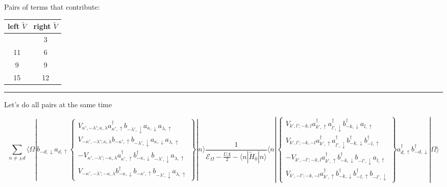 \documentclass[
  letterpaper,
  DIV=11,
  numbers=noendperiod]{scrartcl}
\newcounter{none} %
\begin{document}
Pairs of terms that contribute:

{\def\LTcaptype{none} %
\begin{longtable}[]{@{}cc@{}}
\toprule\noalign{}
left \(\tilde V\) & right \(\tilde V\) \\
\midrule\noalign{}
\endhead
\bottomrule\noalign{}
\endlastfoot
4 & 3 \\
11 & 6 \\
9 & 9 \\
15 & 12 \\
\end{longtable}
}

\begin{center}\rule{0.5\linewidth}{0.5pt}\end{center}

Let's do all pairs at the same time

\begin{equation}
\sum_{n\ne \pm d}\langle\Omega|b_{-d,\downarrow}a_{d,\uparrow}
\left\{
\begin{matrix}
V_{\kappa',-\lambda';\kappa,\lambda}a^\dagger_{\kappa',\uparrow}b^{}_{-\lambda',\downarrow}a^{}_{\kappa,\downarrow}a^{}_{\lambda,\uparrow}\\
V_{-\kappa',-\lambda';\kappa,\lambda}b^{}_{-\kappa',\uparrow}b^{}_{-\lambda',\downarrow}a^{}_{\kappa,\downarrow}a^{}_{\lambda,\uparrow}\\
-V_{\kappa',-\lambda';-\kappa,\lambda}a^\dagger_{\kappa',\uparrow}b^\dagger_{-\kappa,\downarrow}b^{}_{-\lambda',\downarrow}a^{}_{\lambda,\uparrow}\\
V_{-\kappa',-\lambda';-\kappa,\lambda}b^\dagger_{-\kappa,\downarrow}b^{}_{-\kappa',\uparrow}b^{}_{-\lambda',\downarrow}a^{}_{\lambda,\uparrow}
\end{matrix}
\right\}
|n\rangle\frac{1}{\mathcal{E}_\Omega-\frac{U\Lambda}{2}-\langle n|\tilde H_0|n\rangle}\langle n|\left\{
\begin{matrix}
V_{k',l';-k,l}a^\dagger_{k',\uparrow}a^\dagger_{l',\downarrow}b^\dagger_{-k,\downarrow}a^{}_{l,\uparrow}\\
V_{k',l';-k,-l}a^\dagger_{k',\uparrow}a^\dagger_{l',\downarrow}b^\dagger_{-k,\downarrow}b^\dagger_{-l,\uparrow}\\
-V_{k',-l';-k,l}a^\dagger_{k',\uparrow}b^\dagger_{-k,\downarrow}b^{}_{-l',\downarrow}a^{}_{l,\uparrow}\\
V_{k',-l';-k,-l}a^\dagger_{k',\uparrow}b^\dagger_{-k,\downarrow}b^\dagger_{-l,\uparrow}b^{}_{-l',\downarrow}
\end{matrix}
\right\}
a^\dagger_{d,\uparrow}b^\dagger_{-d,\downarrow}|\Omega\rangle
\end{equation}
\end{document}
